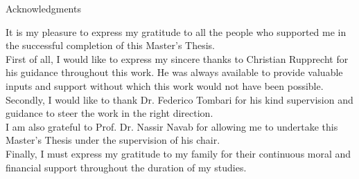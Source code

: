 \thispagestyle{empty}

\vspace*{20mm}

\begin{center}
{ Acknowledgments}
\end{center}

\vspace{10mm}
\noindent
It is my pleasure to express my gratitude to all the people who supported me in the successful completion of this Master’s Thesis. \\

\noindent
First of all, I would like to express my sincere thanks to Christian Rupprecht for his guidance throughout this work. He was always available to provide valuable inputs and support without which this work would not have been possible. \\

\noindent
Secondly, I would like to thank Dr. Federico Tombari for his kind supervision and guidance to steer the work in the right direction. \\

\noindent
I am also grateful to Prof. Dr. Nassir Navab for allowing me to undertake this
Master’s Thesis under the supervision of his chair. \\

\noindent
Finally, I must express my gratitude to my family for their continuous moral and
financial support throughout the duration of my studies.

\cleardoublepage{}
